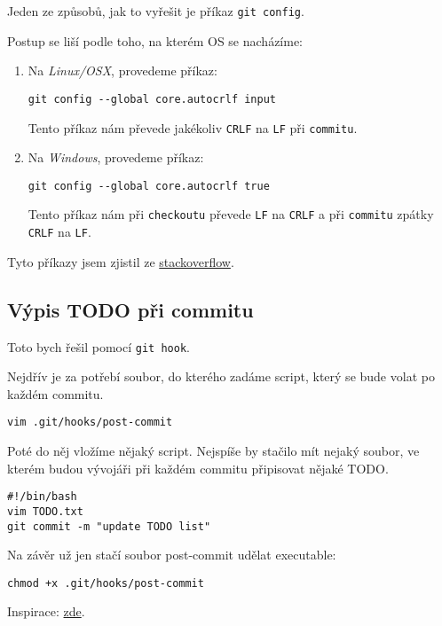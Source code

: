 \documentclass[titlepage]{article}
\begin{document}
Jeden ze způsobů, jak to vyřešit je příkaz \texttt{git config}.

Postup se liší podle toho, na kterém OS se nacházíme:

\begin{enumerate}
    \item Na \emph{Linux/OSX}, provedeme příkaz:
        \begin{verbatim}git config --global core.autocrlf input\end{verbatim}
        Tento příkaz nám převede jakékoliv \texttt{CRLF} na \texttt{LF} při \texttt{commitu}.
    \item Na \emph{Windows}, provedeme příkaz:
        \begin{verbatim}git config --global core.autocrlf true\end{verbatim}
        Tento příkaz nám při \texttt{checkoutu} převede \texttt{LF} na \texttt{CRLF} a při \texttt{commitu} zpátky \texttt{CRLF} na \texttt{LF}.
\end{enumerate}

Tyto příkazy jsem zjistil ze \href{https://stackoverflow.com/questions/10418975/how-to-change-line-ending-settings?utm_medium=organic&utm_source=google_rich_qa&utm_campaign=google_rich_qa}{stackoverflow}.


\subsection{Výpis TODO při commitu}

Toto bych řešil pomocí \texttt{git hook}.

Nejdřív je za potřebí soubor, do kterého zadáme script, který se bude volat po každém commitu.

\begin{verbatim}
vim .git/hooks/post-commit
\end{verbatim}

Poté do něj vložíme nějaký script. Nejspíše by stačilo mít nejaký soubor, ve kterém budou vývojáři při každém commitu připisovat nějaké TODO.

\begin{verbatim}
#!/bin/bash
vim TODO.txt
git commit -m "update TODO list"
\end{verbatim}

Na závěr už jen stačí soubor post-commit udělat executable:

\begin{verbatim}
chmod +x .git/hooks/post-commit
\end{verbatim}

Inspirace: \href{https://www.digitalocean.com/community/tutorials/how-to-use-git-hooks-to-automate-development-and-deployment-tasks}{zde}.
\end{document}
